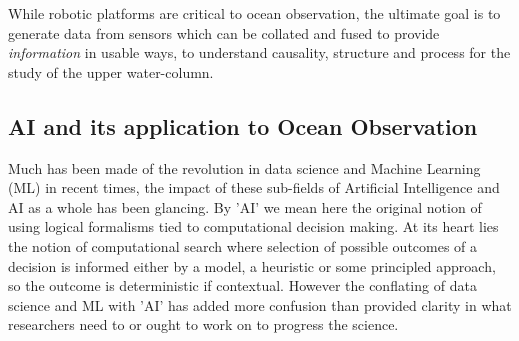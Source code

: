 \begin{figure}
  \centering
  \caption{}
\end{figure}

While robotic platforms are critical to ocean observation, the
ultimate goal is to generate data from sensors which can be collated
and fused to provide \emph{information} in usable ways, to understand
causality, structure and process for the study of the upper
water-column.  

\subsection{AI and its application to Ocean Observation}
\label{sec:ai}

Much has been made of the revolution in data science and Machine
Learning (ML) in recent times, the impact of these sub-fields of
Artificial Intelligence and AI as a whole has been glancing. By 'AI'
we mean here the original notion of using logical formalisms tied to
computational decision making. At its heart lies the notion of
computational search where selection of possible outcomes of a
decision is informed either by a model, a heuristic or some principled
approach, so the outcome is deterministic if contextual. However the
conflating of data science and ML with 'AI' has added more confusion
than provided clarity in what researchers need to or ought to work on
to progress the science.

